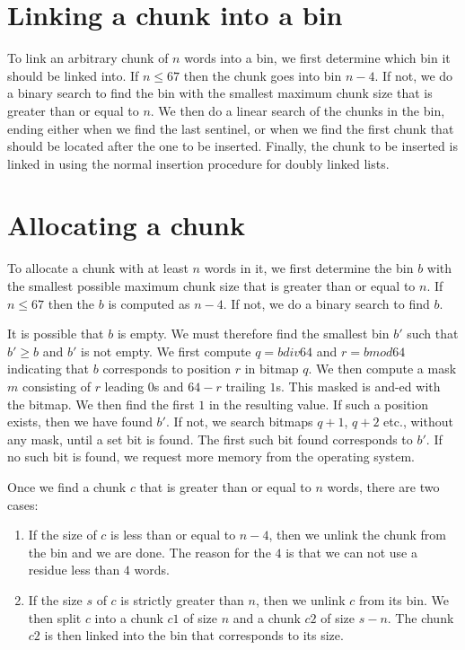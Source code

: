 \section{Linking a chunk into a bin}

To link an arbitrary chunk of $n$ words into a bin, we first determine
which bin it should be linked into.  If $n \le 67$ then the chunk goes
into bin $n-4$.  If not, we do a binary search to find the bin with
the smallest maximum chunk size that is greater than or equal to $n$.
We then do a linear search of the chunks in the bin, ending either
when we find the last sentinel, or when we find the first chunk that
should be located after the one to be inserted.  Finally, the chunk to
be inserted is linked in using the normal insertion procedure for
doubly linked lists.

\section{Allocating a chunk}

To allocate a chunk with at least $n$ words in it, we first determine
the bin $b$ with the smallest possible maximum chunk size that is
greater than or equal to $n$.  If $n \le 67$ then the $b$ is computed
as $n-4$.  If not, we do a binary search to find $b$.

It is possible that $b$ is empty.  We must therefore find the smallest
bin $b'$ such that $b' \ge b$ and $b'$ is not empty.  We first compute
$q = b div 64$ and $r = b mod 64$ indicating that $b$ corresponds to
position $r$ in bitmap $q$.  We then compute a mask $m$ consisting of
$r$ leading $0$s and $64-r$ trailing $1$s.  This masked is and-ed with
the bitmap.  We then find the first $1$ in the resulting value.  If
such a position exists, then we have found $b'$.  If not, we search
bitmaps $q+1$, $q+2$ etc., without any mask, until a set bit is
found.  The first such bit found corresponds to $b'$.  If no such bit
is found, we request more memory from the operating system.

Once we find a chunk $c$ that is greater than or equal to $n$ words,
there are two cases:

\begin{enumerate}
\item If the size of $c$ is less than or equal to $n-4$, then we
  unlink the chunk from the bin and we are done.  The reason for the
  $4$ is that we can not use a residue less than $4$ words.
\item If the size $s$ of $c$ is strictly greater than $n$, then we
  unlink $c$ from its bin.  We then split $c$ into a chunk $c1$ of
  size $n$ and a chunk $c2$ of size $s-n$.  The chunk $c2$ is then
  linked into the bin that corresponds to its size.
\end{enumerate}
